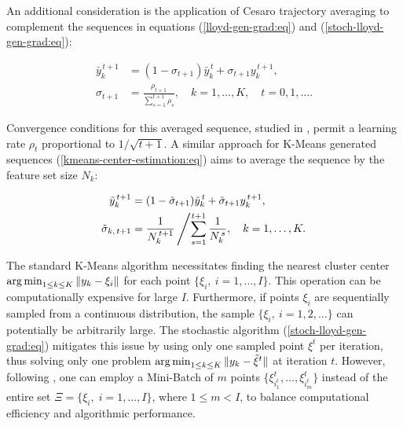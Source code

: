 An additional consideration is the application of Cesaro trajectory averaging \cite{Bottou_Curtis_Nocedal_2018,montavon2012neural} to complement the sequences in equations (\ref{lloyd-gen-grad:eq}) and (\ref{stoch-lloyd-gen-grad:eq}):

\begin{equation}
    \label{kmeans-trajectory-avg:eq}
    \begin{aligned}
        \bar{y}_k^{\,t+1} &= (1 - \sigma_{t+1}) \bar{y}_k^{\,t} + \sigma_{t+1} y_k^{\,t+1}, \\
        \sigma_{t+1} &= \frac{\rho_{t+1}}{\sum_{s=1}^{t+1} \rho_{s}}, \quad k = 1, \ldots, K, \quad t=0,1,\ldots.
    \end{aligned}
\end{equation}

Convergence conditions for this averaged sequence, studied in \cite{mikhalevich2024}, permit a learning rate $\rho_t$ proportional to $1 / \sqrt{t+1}$. A similar approach for K-Means generated sequences (\ref{kmeans-center-estimation:eq}) aims to average the sequence by the feature set size $N_k$:

\begin{equation}
    \label{kmeans-trajectory-avg-alt:eq}
    \begin{aligned}
        \tilde{y}_k^{\,t+1} &= (1 - \tilde{\sigma}_{t+1}) \tilde{y}_k^{\,t} + \tilde{\sigma}_{t+1} y_k^{\,t+1}, \\
        \tilde{\sigma}_{k, \,t+1} &= \frac{1}{N_k^{\,t+1}} \left/ \sum_{s=1}^{t+1} \frac{1}{N_k^{\,s}}, \quad k = 1, \ldots, K. \right.
    \end{aligned}
\end{equation}

The standard K-Means algorithm necessitates finding the nearest cluster center $\operatorname*{arg\,min}_{1 \leq k \leq K} \| y_k - \xi_i \|$ for each point $\{ \xi_i, \> i = 1, \ldots, I \}$. This operation can be computationally expensive for large $I$. Furthermore, if points $\xi_i$ are sequentially sampled from a continuous distribution, the sample $\{ \xi_i, \> i = 1, 2, \ldots \}$ can potentially be arbitrarily large. The stochastic algorithm (\ref{stoch-lloyd-gen-grad:eq}) mitigates this issue by using only one sampled point ${\xi}^t$ per iteration, thus solving only one problem $\operatorname*{arg\,min}_{1 \leq k \leq K} \| y_k - \tilde{\xi}^t \|$ at iteration $t$. However, following \cite{Sculley_2010}, one can employ a Mini-Batch of $m$ points $\{ {\xi}^t_{i_1^t}, \ldots, {\xi}^t_{i_m^t} \}$ instead of the entire set $\Xi= \{ \xi_i,\;i=1,\ldots,I \}$, where $1 \leq m < I$, to balance computational efficiency and algorithmic performance.
